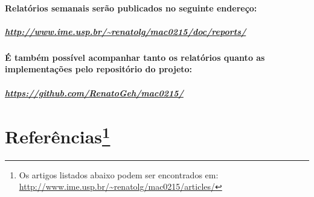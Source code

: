 \documentclass[a4paper,10pt]{article}
\theoremstyle{plain}
\begin{document}
\paragraph{
  Relatórios semanais serão publicados no seguinte endereço: 
}

\subparagraph{\url{http://www.ime.usp.br/~renatolg/mac0215/doc/reports/}}

\paragraph{
  É também possível acompanhar tanto os relatórios quanto as implementações pelo repositório
do projeto:
}

\subparagraph{\url{https://github.com/RenatoGeh/mac0215/}}

\newpage

\section{Referências\footnote{Os artigos listados abaixo podem ser encontrados em: 
  \url{http://www.ime.usp.br/~renatolg/mac0215/articles/}}}

\printbibliography[title={Artigos},type=article]
\printbibliography[title={Websites},type=misc]
\end{document}
